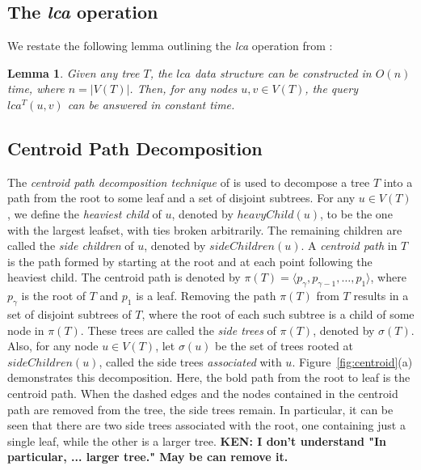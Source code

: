 \documentclass[final,1p,times]{elsarticle}
\newtheorem{lemma}[theorem]{Lemma}
\begin{document}
    \subsection{The \textit{lca} operation}

    We restate the following lemma outlining the \textit{lca} operation from \cite{bender2000lca}:

    \begin{lemma}
        \label{lem:lca}
        Given any tree $T$, the $lca$ data structure can be constructed in $O(n)$ time, where $n = |V(T)|$. Then, for any nodes $u, v \in V(T)$, the query $lca^{T}(u, v)$ can be answered in constant time.
    \end{lemma}





    \subsection{Centroid Path Decomposition}

    The \textit{centroid path decomposition technique} of \cite{cole2000n} is used to decompose a tree $T$ into a path from the root to some leaf and a set of disjoint subtrees. For any $u \in V(T)$, we define the \textit{heaviest child} of $u$, denoted by $heavyChild(u)$, to be the one with the largest leafset, with ties broken arbitrarily. The remaining children are called the \textit{side children} of $u$, denoted by $sideChildren(u)$. A \textit{centroid path} in $T$ is the path formed by starting at the root and at each point following the heaviest child. The centroid path is denoted by $\pi(T) = \langle p_{\gamma}, p_{\gamma - 1}, \ldots, p_1 \rangle$, where $p_{\gamma}$ is the root of $T$ and $p_1$ is a leaf. Removing the path $\pi(T)$ from $T$ results in a set of disjoint subtrees of $T$, where the root of each such subtree is a child of some node in $\pi(T)$. These trees are called the \textit{side trees} of $\pi(T)$, denoted by $\sigma(T)$. Also, for any node $u \in V(T)$, let $\sigma(u)$ be the set of trees rooted at $sideChildren(u)$, called the side trees \textit{associated} with $u$. Figure~\ref{fig:centroid}(a) demonstrates this decomposition. Here, the bold path from the root to leaf is the centroid path. When the dashed edges and the nodes contained in the centroid path are removed from the tree, the side trees remain. In particular, it can be seen that there are two side trees associated with the root, one containing just a single leaf, while the other is a larger tree. {\bf KEN: I don't understand "In particular, ... larger tree." May be can remove it.}
\end{document}
